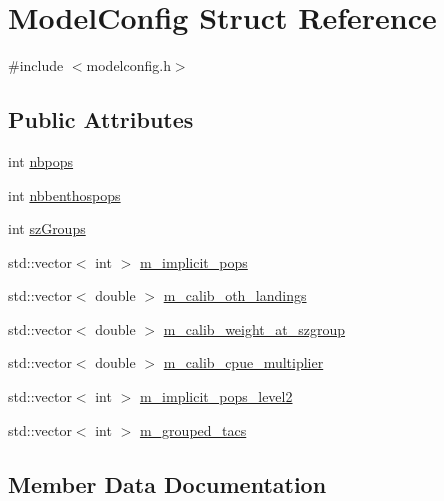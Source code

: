 \hypertarget{struct_model_config}{}\section{Model\+Config Struct Reference}
\label{struct_model_config}


{\ttfamily \#include $<$modelconfig.\+h$>$}

\subsection*{Public Attributes}
\begin{DoxyCompactItemize}
\item 
int \mbox{\hyperlink{struct_model_config_a10f0d465214f96409224887f14d1b9f0}{nbpops}}
\item 
int \mbox{\hyperlink{struct_model_config_ac9b76a1888fe723ba1747f02f51f0274}{nbbenthospops}}
\item 
int \mbox{\hyperlink{struct_model_config_a66e3ca673d92470cd164e588348dabbe}{sz\+Groups}}
\item 
std\+::vector$<$ int $>$ \mbox{\hyperlink{struct_model_config_ab3bc45ab70366606c961663055f62caf}{m\+\_\+implicit\+\_\+pops}}
\item 
std\+::vector$<$ double $>$ \mbox{\hyperlink{struct_model_config_a7fba3c7f5d4057d189e3be2fe6b4df9d}{m\+\_\+calib\+\_\+oth\+\_\+landings}}
\item 
std\+::vector$<$ double $>$ \mbox{\hyperlink{struct_model_config_a979332f0ac761c4e0dfe4f967a431671}{m\+\_\+calib\+\_\+weight\+\_\+at\+\_\+szgroup}}
\item 
std\+::vector$<$ double $>$ \mbox{\hyperlink{struct_model_config_a5c770153df48dabeef59cbea9599dded}{m\+\_\+calib\+\_\+cpue\+\_\+multiplier}}
\item 
std\+::vector$<$ int $>$ \mbox{\hyperlink{struct_model_config_a598e1f7db8c36aa6309ace7470cd4670}{m\+\_\+implicit\+\_\+pops\+\_\+level2}}
\item 
std\+::vector$<$ int $>$ \mbox{\hyperlink{struct_model_config_a05d678a30e28104d80ef9ae9558e59f8}{m\+\_\+grouped\+\_\+tacs}}
\end{DoxyCompactItemize}


\subsection{Member Data Documentation}
\mbox{\label{struct_model_config_a5c770153df48dabeef59cbea9599dded}} 
